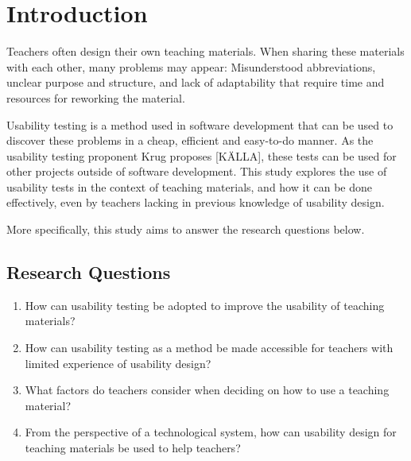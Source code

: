 \chapter{Introduction}

Teachers often design their own teaching materials. When sharing these materials with each other, many problems may appear: Misunderstood abbreviations, unclear purpose and structure, and lack of adaptability that require time and resources for reworking the material.

Usability testing is a method used in software development that can be used to discover these problems in a cheap, efficient and easy-to-do manner. As the usability testing proponent Krug proposes [KÄLLA], these tests can be used for other projects outside of software development. This study explores the use of usability tests in the context of teaching materials, and how it can be done effectively, even by teachers lacking in previous knowledge of usability design.

More specifically, this study aims to answer the research questions below.

\section{Research Questions}
\begin{enumerate}
	\item How can usability testing be adopted to improve the usability of teaching materials?
	\item How can usability testing as a method be made accessible for teachers with limited experience of usability design?
	\item What factors do teachers consider when deciding on how to use a teaching material?
	\item From the perspective of a technological system, how can usability design for teaching materials be used to help teachers?
\end{enumerate}


